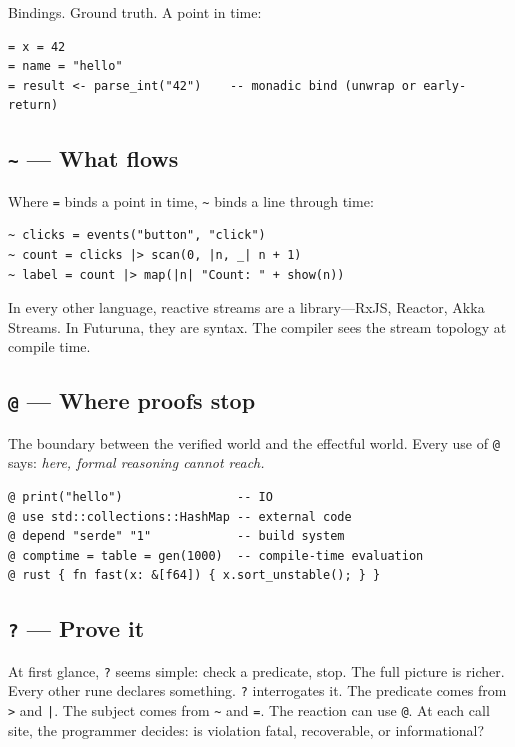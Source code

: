 \documentclass[11pt,a4paper]{article}
\begin{document}
Bindings. Ground truth. A point in time:

\begin{lstlisting}
= x = 42
= name = "hello"
= result <- parse_int("42")    -- monadic bind (unwrap or early-return)
\end{lstlisting}

\subsection{\texttt{\textasciitilde} --- What flows}

Where \texttt{=} binds a point in time, \texttt{\textasciitilde} binds a line through time:

\begin{lstlisting}
~ clicks = events("button", "click")
~ count = clicks |> scan(0, |n, _| n + 1)
~ label = count |> map(|n| "Count: " + show(n))
\end{lstlisting}

In every other language, reactive streams are a library---RxJS, Reactor, Akka Streams. In Futuruna, they are syntax. The compiler sees the stream topology at compile time.

\subsection{\texttt{@} --- Where proofs stop}

The boundary between the verified world and the effectful world. Every use of \texttt{@} says: \emph{here, formal reasoning cannot reach.}

\begin{lstlisting}
@ print("hello")                -- IO
@ use std::collections::HashMap -- external code
@ depend "serde" "1"            -- build system
@ comptime = table = gen(1000)  -- compile-time evaluation
@ rust { fn fast(x: &[f64]) { x.sort_unstable(); } }
\end{lstlisting}

\subsection{\texttt{?} --- Prove it}

At first glance, \texttt{?} seems simple: check a predicate, stop. The full picture is richer. Every other rune declares something. \texttt{?} interrogates it. The predicate comes from \texttt{>} and \texttt{|}. The subject comes from \texttt{\textasciitilde} and \texttt{=}. The reaction can use \texttt{@}. At each call site, the programmer decides: is violation fatal, recoverable, or informational?
\end{document}
